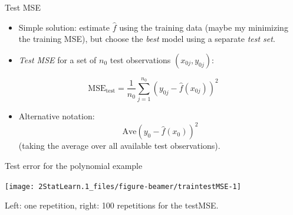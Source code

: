 \documentclass[
  ignorenonframetext,
]{beamer}
\providecommand{\tightlist}{%
  \setlength{\itemsep}{0pt}\setlength{\parskip}{0pt}}
\begin{document}
\begin{frame}
\begin{block}{Test MSE}
\protect\hypertarget{test-mse}{}
\(~\)

\begin{itemize}
\tightlist
\item
  Simple solution: estimate \(\hat{f}\) using the training data (maybe
  my minimizing the training MSE), but choose the \emph{best} model
  using a separate \emph{test set}.
\end{itemize}

\vspace{2mm}

\begin{itemize}
\tightlist
\item
  \emph{Test MSE} for a set of \(n_0\) test observations
  \((x_{0j},y_{0j})\):
\end{itemize}

\[ \text{MSE}_{\text{test}}=\frac{1}{n_0}\sum_{j=1}^{n_0} (y_{0j}-\hat{f}(x_{0j}))^2\]

\vspace{2mm}

\begin{itemize}
\tightlist
\item
  Alternative notation: \[\text{Ave}(y_0-\hat{f}(x_0))^2\] (taking the
  average over all available test observations).
\end{itemize}
\end{block}
\end{frame}

\begin{frame}
\begin{block}{Test error for the polynomial example}
\protect\hypertarget{test-error-for-the-polynomial-example}{}
\(~\)

\begin{center}\texttt{[image: 2StatLearn.1\_files/figure-beamer/traintestMSE-1]} \end{center}

Left: one repetition, right: 100 repetitions for the testMSE.
\end{block}
\end{frame}
\end{document}
